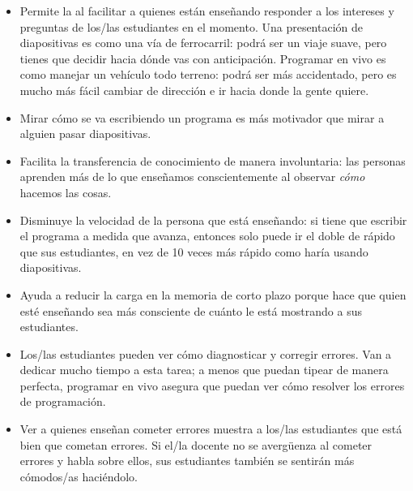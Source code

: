 \begin{itemize}

\item
  Permite la 
  al facilitar a quienes están enseñando responder a los intereses y preguntas de los/las estudiantes en el momento.
  Una presentación de diapositivas es como una vía de ferrocarril:
  podrá ser un viaje suave,
  pero tienes que decidir hacia dónde vas con anticipación.
  Programar en vivo es como manejar un vehículo todo terreno:
  podrá ser más accidentado,
  pero es mucho más fácil cambiar de dirección e ir hacia donde la gente quiere.

\item
  Mirar cómo se va escribiendo un programa es más motivador
  que mirar a alguien pasar diapositivas.

\item
  Facilita la transferencia de conocimiento de manera involuntaria:
  las personas aprenden más de lo que enseñamos conscientemente
  al observar \emph{cómo} hacemos las cosas.

\item
  Disminuye la velocidad de la persona que está enseñando:
  si tiene que escribir el programa a medida que avanza,
  entonces solo puede ir el doble de rápido que sus estudiantes,
  en vez de 10 veces más rápido como haría usando diapositivas.

\item
  Ayuda a reducir la carga en la memoria de corto plazo
  porque hace que quien esté enseñando sea más consciente de cuánto
  le está mostrando a sus estudiantes.

\item
  Los/las estudiantes pueden ver cómo diagnosticar y corregir errores.
  Van a dedicar mucho tiempo a esta tarea;
  a menos que puedan tipear de manera perfecta,
  programar en vivo asegura que puedan ver cómo resolver los errores de programación.

\item
  Ver a quienes enseñan cometer errores muestra a los/las estudiantes que está bien que cometan errores.
  Si el/la docente no se avergüenza al cometer errores y habla sobre ellos,
  sus estudiantes también se sentirán más cómodos/as haciéndolo.

\end{itemize}

